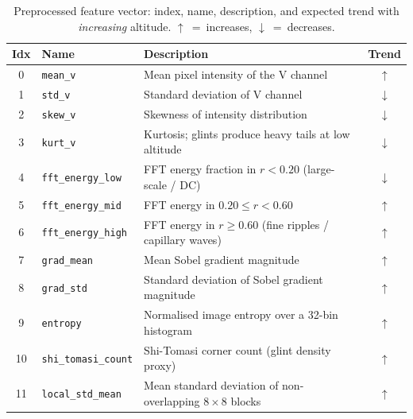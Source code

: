 \begin{table}[htbp]
    \caption{Preprocessed feature vector: index, name, description, and
             expected trend with \emph{increasing} altitude.
             $\uparrow$~=~increases, $\downarrow$~=~decreases.}
    \begin{center}
        \small
        \begin{tabular}{|c|l|p{7cm}|c|}
        \hline
        \textbf{Idx} & \textbf{Name} & \textbf{Description} & \textbf{Trend} \\
        \hline
        0  & \texttt{mean\_v}
           & Mean pixel intensity of the V channel
           & $\uparrow$ \\
        \hline
        1  & \texttt{std\_v}
           & Standard deviation of V channel
           & $\downarrow$ \\
        \hline
        2  & \texttt{skew\_v}
           & Skewness of intensity distribution
           & $\downarrow$ \\
        \hline
        3  & \texttt{kurt\_v}
           & Kurtosis; glints produce heavy tails at low altitude
           & $\downarrow$ \\
        \hline
        4  & \texttt{fft\_energy\_low}
           & FFT energy fraction in $r < 0.20$ (large-scale / DC)
           & $\downarrow$ \\
        \hline
        5  & \texttt{fft\_energy\_mid}
           & FFT energy in $0.20 \leq r < 0.60$
           & $\uparrow$ \\
        \hline
        6  & \texttt{fft\_energy\_high}
           & FFT energy in $r \geq 0.60$ (fine ripples / capillary waves)
           & $\uparrow$ \\
        \hline
        7  & \texttt{grad\_mean}
           & Mean Sobel gradient magnitude
           & $\uparrow$ \\
        \hline
        8  & \texttt{grad\_std}
           & Standard deviation of Sobel gradient magnitude
           & $\uparrow$ \\
        \hline
        9  & \texttt{entropy}
           & Normalised image entropy over a 32-bin histogram
           & $\uparrow$ \\
        \hline
        10 & \texttt{shi\_tomasi\_count}
           & Shi-Tomasi corner count (glint density proxy)
           & $\uparrow$ \\
        \hline
        11 & \texttt{local\_std\_mean}
           & Mean standard deviation of non-overlapping $8\times8$ blocks
           & $\uparrow$ \\
        \hline
        \end{tabular}
    \label{tab:features}
    \end{center}
\end{table}

